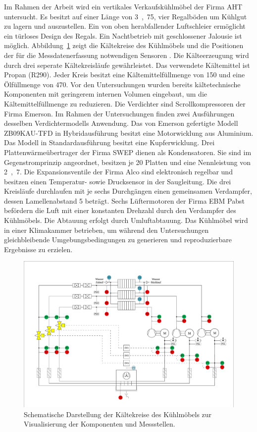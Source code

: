 Im Rahmen der Arbeit wird ein vertikales Verkaufskühlmöbel der Firma AHT untersucht.
Es besitzt auf einer Länge von \unit{3,75}{\metre}, vier Regalböden um Kühlgut zu lagern und auszustellen. Ein von oben herabfallender Luftschleier ermöglicht ein türloses Design des Regals. Ein Nachtbetrieb mit geschlossener Jalousie ist möglich. \newline Abbildung~\ref{fig:IDC150} zeigt die Kältekreise des Kühlmöbels und die Positionen der für die Messdatenerfassung notwendigen Sensoren \cite{DINDeutschesInstitutfurNormunge.V..1998}. Die Kälteerzeugung wird durch drei seperate Kältekreisläufe gewährleistet. Das verwendete Kältemittel ist Propan (R290). Jeder Kreis besitzt eine Kältemittelfüllmenge von \unit{150}{\gram} und eine Ölfüllmenge von \unit{470}{\gram}. Vor den Untersuchungen wurden bereits kältetechnische Komponenten mit geringerem internen Volumen eingebaut, um die Kältemittelfüllmenge zu reduzieren. Die Verdichter sind Scrollkompressoren der Firma Emerson. Im Rahmen der Untersuchungen finden zwei Ausführungen desselben Verdichtermodells Anwendung. Das von Emerson gefertigte Modell ZB09KAU-TFD in Hybridausführung besitzt eine Motorwicklung aus Aluminium. Das Modell in Standardausführung besitzt eine Kupferwicklung. Drei Plattenwärmeübertrager der Firma SWEP dienen als Kondensatoren. Sie sind im Gegenstromprinzip angeordnet, besitzen je 20 Platten und eine Nennleistung von \unit{2,7}{\kilo\watt}. Die Expansionsventile der Firma Alco sind elektronisch regelbar und besitzen einen Temperatur- sowie Drucksensor in der Saugleitung. Die drei Kreisläufe durchlaufen mit je sechs Durchgängen einen gemeinsamen Verdampfer, dessen Lamellenabstand \unit{5}{\milli\metre} beträgt. Sechs Lüftermotoren der Firma EBM Pabst befördern die Luft mit einer konstanten Drehzahl durch den Verdampfer des Kühlmöbels. Die Abtauung erfolgt durch Umluftabtauung. Das Kühlmöbel wird in einer Klimakammer betrieben, um während den Untersuchungen gleichbleibende Umgebungsbedingungen zu generieren und reproduzierbare Ergebnisse zu erzielen.

\begin{figure} %
\centering
\includegraphics[scale=.56,angle=90]{Pictures/IDC150.pdf}
\caption{Schematische Darstellung der Kältekreise des Kühlmöbels zur Visualisierung der Komponenten und Messstellen.}
\label{fig:IDC150}
\end{figure}

